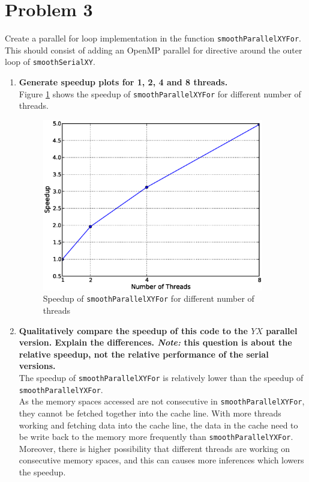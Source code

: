 \documentclass[letterpaper, 11pt]{article}
\begin{document}
\section{Problem 3}
Create a parallel for loop implementation in the function \texttt{smoothParallelXYFor}. This should consist of adding an OpenMP parallel for directive around the outer loop of \texttt{smoothSerialXY}.

\begin{enumerate}
\item \textbf{Generate speedup plots for 1, 2, 4 and 8 threads.}\\
Figure \ref{fig:xyspeedup} shows the speedup of \texttt{smoothParallelXYFor} for different number of threads.
\begin{figure}[h]
    \centering
    \includegraphics[width=3.8in]{xyparallelspeedup.eps}
    \caption{Speedup of \texttt{smoothParallelXYFor} for different number of threads}
    \label{fig:xyspeedup}
\end{figure}

\item \textbf{Qualitatively compare the speedup of this code to the $YX$ parallel version. Explain the differences. \textit{Note:} this question is about the relative speedup, not the relative performance of the serial versions.}\\
The speedup of \texttt{smoothParallelXYFor} is relatively lower than the speedup of \texttt{smoothParallelYXFor}. \\
As the memory spaces accessed are not consecutive in \texttt{smoothParallelXYFor}, they cannot be fetched together into the cache line. With more threads working and fetching data into the cache line, the data in the cache need to be write back to the memory more frequently than \texttt{smoothParallelYXFor}. Moreover, there is higher possibility that different threads are working on consecutive memory spaces, and this can causes more inferences which lowers the speedup.
\end{enumerate}
\end{document}
